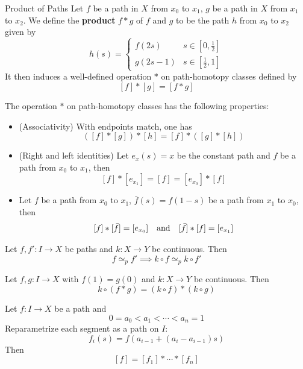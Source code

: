\documentclass[12pt,a4paper]{article}
\begin{document}
    \begin{defi}{Product of Paths}
        Let $f$ be a path in $X$ from $x_0$ to $x_1$, $g$ be a path in $X$ from $x_1$ to $x_2$. We define the \textbf{product} $f*g$ of $f$ and $g$ to be the path $h$ from $x_0$ to $x_2$ given by
        \[
            h(s)=\begin{cases}
                f(2s)&s\in[0,\frac{1}{2}]\\
                g(2s-1)&s\in[\frac{1}{2},1]
            \end{cases}
        \]
        It then induces a well-defined operation $*$ on path-homotopy classes defined by
        \[
            \boxed{[f]*[g]=[f*g]}
        \]
    \end{defi}
    \begin{thm}
        The operation $*$ on path-homotopy classes has the following properties:
        \begin{itemize}
            \item (Associativity) With endpoints match, one has
            \[
                ([f]*[g])*[h]=[f]*([g]*[h])
            \]
            \item (Right and left identities) Let $e_x(s)=x$ be the constant path and $f$ be a path from $x_0$ to $x_1$, then
            \[
                [f]*[e_{x_1}]=[f]=[e_{x_0}]*[f]
            \]
            \item Let $f$ be a path from $x_0$ to $x_1$, $\bar{f}(s)=f(1-s)$ be a path from $x_1$ to $x_0$, then
            \[
                [f]*[\bar{f}]=[e_{x_0}]\quad\text{and}\quad [\bar{f}]*[f]=[e_{x_1}]
            \]
        \end{itemize}
    \end{thm}
    \begin{remark}
        Let $f,f':I\to X$ be paths and $k:X\to Y$ be continuous. Then
        \[
            f\simeq_p f'\implies k\circ f\simeq_p k\circ f'
        \]
    \end{remark}
    \begin{remark}
        Let $f,g:I\to X$ with $f(1)=g(0)$ and $k:X\to Y$ be continuous. Then
        \[
            k\circ(f*g)=(k\circ f)*(k\circ g)
        \]
    \end{remark}
    \bigskip

    \begin{thm}
        Let $f:I\to X$ be a path and
        \[
            0=a_0<a_1<\cdots<a_n=1
        \]
        Reparametrize each segment as a path on $I$:
        \[
            f_i(s)=f(a_{i-1}+(a_i-a_{i-1})s)
        \]
        Then
        \[
            [f]=[f_1]*\cdots*[f_n]
        \]
    \end{thm}
    \bigskip
\end{document}
